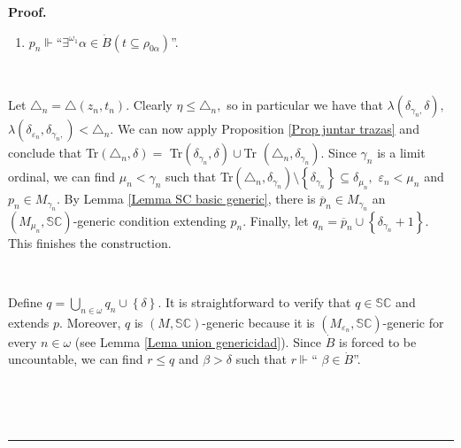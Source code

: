 \documentclass{article}
\newenvironment{proof}[1][Proof]{\noindent\textbf{#1.} }{\ \rule{0.5em}{0.5em}}
\begin{document}
\begin{proof}
\begin{enumerate}
\item $p_{n}\Vdash$\textquotedblleft$\exists^{\omega_{1}}\alpha\in\dot
{B}\left(  t\subseteq\rho_{0\alpha}\right)  $\textquotedblright.
\end{enumerate}

\qquad\ \ \ 

Let $\triangle_{n}=\triangle\left(  z_{n},t_{n}\right)  .$ Clearly $\eta
\leq\triangle_{n},$ so in particular we have that $\lambda\left(
\delta_{\gamma_{n},}\delta\right)  ,$ $\lambda\left(  \delta_{\varepsilon_{n}%
},\delta_{\gamma_{n},}\right)  <\triangle_{n}.$ We can now apply Proposition
\ref{Prop juntar trazas} and conclude that \newline\textsf{Tr}$(\triangle
_{n},\delta)=$ \textsf{Tr}$(\delta_{\gamma_{n}},\delta)\cup$\textsf{Tr}%
$(\triangle_{n},\delta_{\gamma_{n}}).$ Since $\gamma_{n}$ is a limit ordinal,
we can find $\mu_{n}<\gamma_{n}$ such that \textsf{Tr}$(\triangle_{n}%
,\delta_{\gamma_{n}})\setminus\left\{  \delta_{\gamma_{n}}\right\}
\subseteq\delta_{\mu_{n}},$ $\varepsilon_{n}<\mu_{n}$ and $p_{n}\in
M_{\gamma_{n}}.$ By Lemma \ref{Lemma SC basic generic}, there is $\overline
{p}_{n}\in M_{\gamma_{n}}$ an $(M_{\mu_{n}},\mathbb{SC})$-generic condition
extending $p_{n}.$ Finally, let $q_{n}=\overline{p}_{n}\cup\left\{
\delta_{\gamma_{n}}+1\right\}  .$ This finishes the construction.

\qquad\qquad\qquad\ \ \ 

Define $q=\bigcup\limits_{n\in\omega}q_{n}\cup\left\{  \delta\right\}  .$ It
is straightforward to verify that $q\in\mathbb{SC}$ and extends $p.$ Moreover,
$q$ is $(M,\mathbb{SC})$-generic because it is $(M_{\varepsilon_{n}%
},\mathbb{SC})$-generic for every $n\in\omega$ (see Lemma
\ref{Lema union genericidad}). Since $\dot{B}$ is forced to be uncountable, we
can find $r\leq q$ and $\beta>\delta$ such that $r\Vdash$\textquotedblleft%
$\beta\in\dot{B}$\textquotedblright.

\qquad\qquad\ \qquad\ \ \ 


\end{proof}
\end{document}
